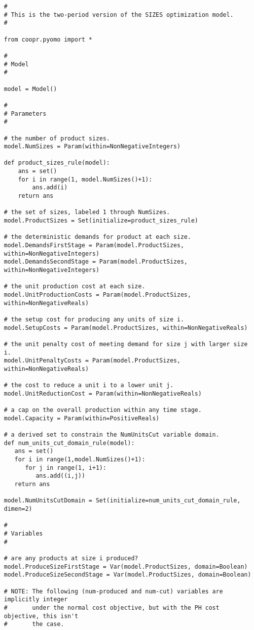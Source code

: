 {\small
\begin{verbatim}
#
# This is the two-period version of the SIZES optimization model.
#

from coopr.pyomo import *

#
# Model
#

model = Model()

#
# Parameters
#

# the number of product sizes.
model.NumSizes = Param(within=NonNegativeIntegers)

def product_sizes_rule(model):
    ans = set()
    for i in range(1, model.NumSizes()+1):
        ans.add(i)
    return ans

# the set of sizes, labeled 1 through NumSizes.
model.ProductSizes = Set(initialize=product_sizes_rule)

# the deterministic demands for product at each size.
model.DemandsFirstStage = Param(model.ProductSizes, within=NonNegativeIntegers)
model.DemandsSecondStage = Param(model.ProductSizes, within=NonNegativeIntegers)

# the unit production cost at each size.
model.UnitProductionCosts = Param(model.ProductSizes, within=NonNegativeReals)

# the setup cost for producing any units of size i.
model.SetupCosts = Param(model.ProductSizes, within=NonNegativeReals)

# the unit penalty cost of meeting demand for size j with larger size i.
model.UnitPenaltyCosts = Param(model.ProductSizes, within=NonNegativeReals)

# the cost to reduce a unit i to a lower unit j.
model.UnitReductionCost = Param(within=NonNegativeReals)

# a cap on the overall production within any time stage.
model.Capacity = Param(within=PositiveReals)

# a derived set to constrain the NumUnitsCut variable domain.
def num_units_cut_domain_rule(model):
   ans = set()
   for i in range(1,model.NumSizes()+1):
      for j in range(1, i+1):
         ans.add((i,j))
   return ans

model.NumUnitsCutDomain = Set(initialize=num_units_cut_domain_rule, dimen=2)

#
# Variables
#

# are any products at size i produced?
model.ProduceSizeFirstStage = Var(model.ProductSizes, domain=Boolean)
model.ProduceSizeSecondStage = Var(model.ProductSizes, domain=Boolean)

# NOTE: The following (num-produced and num-cut) variables are implicitly integer
#       under the normal cost objective, but with the PH cost objective, this isn't
#       the case.


\end{verbatim}}
